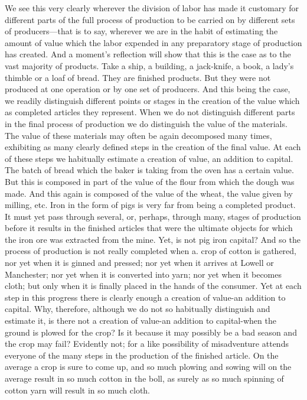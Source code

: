 We see this very clearly wherever the division of labor has made it
customary for different parts of the full process of production to be
carried on by different sets of producers---that is to say, wherever we
are in the habit of estimating the amount of value which the labor
expended in any preparatory stage of production has created. And a
moment's reflection will show that this is the case as to the vast
majority of products. Take a ship, a building, a jack-knife, a book, a
lady's thimble or a loaf of bread. They are finished products. But they
were not produced at one operation or by one set of producers. And this
being the case, we readily distinguish different points or stages in the
creation of the value which as completed articles they represent. When
we do not distinguish different parts in the final process of production
we do distinguish the value of the materials. The value of these
materials may often be again decomposed many times, exhibiting as many
clearly defined steps in the creation of the final value. At each of
these steps we habitually estimate a creation of value, an addition to
capital. The batch of bread which the baker is taking from the oven has
a certain value. But this is composed in part of the value of the flour
from which the dough was made. And this again is composed of the value
of the wheat, the value given by milling, etc. Iron in the form of pigs
is very far from being a completed product. It must yet pass through
several, or, perhaps, through many, stages of production before it
results in the finished articles that were the ultimate objects for
which the iron ore was extracted from the mine. Yet, is not pig iron
capital? And so the process of production is not really completed when
a. crop of cotton is gathered, nor yet when it is ginned and pressed;
nor yet when it arrives at Lowell or Manchester; nor yet when it is
converted into yarn; nor yet when it becomes cloth; but only when it is
finally placed in the hands of the consumer. Yet at each step in this
progress there is clearly enough a creation of value-an addition to
capital. Why, therefore, although we do not so habitually distinguish
and estimate it, is there not a creation of value-an addition to
capital-when the ground is plowed for the crop? Is it because it may
possibly be a bad season and the crop may fail? Evidently not; for a
like possibility of misadventure attends everyone of the many steps in
the production of the finished article. On the average a crop is sure to
come up, and so much plowing and sowing will on the average result in so
much cotton in the boll, as surely as so much spinning of cotton yarn
will result in so much cloth.


